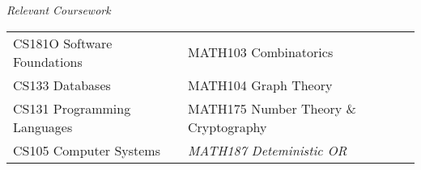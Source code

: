 {\it Relevant Coursework} \\
\begin{tabular}{l l}
CS181O Software Foundations & MATH103 Combinatorics \\
CS133 Databases & MATH104 Graph Theory \\
CS131 Programming Languages & MATH175 Number Theory \& Cryptography \\
CS105 Computer Systems & \textit{MATH187 Deteministic OR} \\
\end{tabular}
